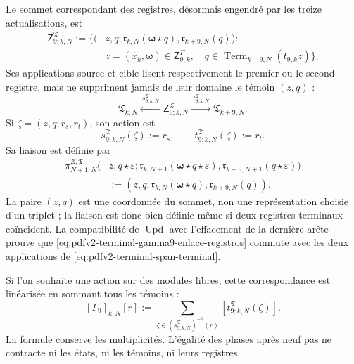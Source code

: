 Le sommet correspondant des registres, désormais engendré par les treize actualisations, est
\begin{equation}
\label{eq:pdfv2-terminal-apice-terminal-gamma9}
 \begin{split}
 \mathsf Z^{\mathfrak T}_{9;k,N}:=\bigl\{
 (&z,q;
   \mathfrak r_{k,N}(\boldsymbol\omega\star q),
   \mathfrak r_{k+9,N}(q)):\\
 &z=(\widehat x_k,\boldsymbol\omega)\in
       \mathsf Z^\Gamma_{9,k},\quad
 q\in\operatorname{Term}_{k+9,N}(t_{9,k}z)
 \bigr\}.
 \end{split}
\end{equation}
Ses applications source et cible lisent respectivement le premier ou le second registre, mais ne suppriment jamais de leur domaine le témoin \((z,q)\) :
\begin{equation}
\label{eq:pdfv2-terminal-span-terminal}
 \mathfrak T_{k,N}
 \xleftarrow{\ s^{\mathfrak T}_{9;k,N}\ }
 \mathsf Z^{\mathfrak T}_{9;k,N}
 \xrightarrow{\ t^{\mathfrak T}_{9;k,N}\ }
 \mathfrak T_{k+9,N}.
\end{equation}
Si \(\zeta=(z,q;r_s,r_t)\), son action est
\begin{equation}
\label{eq:pdfv2-terminal-span-terminal-accion}
 s^{\mathfrak T}_{9;k,N}(\zeta):=r_s,
 \qquad
 t^{\mathfrak T}_{9;k,N}(\zeta):=r_t.
\end{equation}
Sa liaison est définie par
\begin{equation}
\label{eq:pdfv2-terminal-gamma9-enlace-registros}
 \begin{split}
 \pi^{Z,\mathfrak T}_{N+1,N}
 \bigl(&z,q\star\varepsilon;
       \mathfrak r_{k,N+1}
          (\boldsymbol\omega\star q\star\varepsilon),
       \mathfrak r_{k+9,N+1}(q\star\varepsilon)\bigr)\\
 &:=(z,q;\mathfrak r_{k,N}(\boldsymbol\omega\star q),
       \mathfrak r_{k+9,N}(q)).
 \end{split}
\end{equation}
La paire \((z,q)\) est une coordonnée du sommet, non une représentation choisie d'un triplet ; la liaison est donc bien définie même si deux registres terminaux coïncident. La compatibilité de \(\operatorname{Upd}\) avec l'effacement de la dernière arête prouve que \eqref{eq:pdfv2-terminal-gamma9-enlace-registros} commute avec les deux applications de \eqref{eq:pdfv2-terminal-span-terminal}.

Si l'on souhaite une action sur des modules libres, cette correspondance est linéarisée en sommant tous les témoins :
\begin{equation}
\label{eq:pdfv2-terminal-linealizacion-span}
 [\Gamma_9]_{k,N}[r]
 :=\sum_{\zeta\in(s^{\mathfrak T}_{9;k,N})^{-1}(r)}
 [t^{\mathfrak T}_{9;k,N}(\zeta)].
\end{equation}
La formule conserve les multiplicités. L'égalité des phases après neuf pas ne contracte ni les états, ni les témoins, ni leurs registres.

